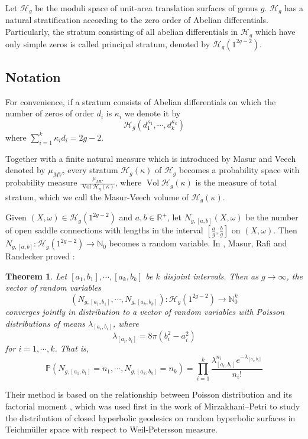 \documentclass[12pt]{amsart} %
\newtheorem{theorem}{Theorem}[section]
\theoremstyle{definition}
\theoremstyle{remark}
\numberwithin{equation}{section}
\renewcommand\H{{\mathcal H}}
\newcommand{\V}{\operatorname{Vol}}
\begin{document}
Let $\H_g$ be the moduli space of unit-area translation surfaces of genus $g$.
$\H_g$ has a natural stratification according to the zero order of Abelian differentials.
Particularly, the stratum consisting of all abelian differentials in $\H_g$ which have only simple zeros is called principal stratum, 
denoted by $\H_g(1^{2g-2})$. 

\subsection*{Notation}
For convenience, if a stratum consists of Abelian differentials on which the number of zeros of order $d_i$ is $\kappa_i$
we denote it by 
$$\H_g(d_1^{\kappa_1},\cdots,d_k^{\kappa_k})$$
where $\sum^{k}_{i=1}\kappa_id_i=2g-2$.


Together with a finite natural measure which is introduced by Masur and Veech denoted by $\mu_{MV}$, 
every stratum $\H_g(\kappa)$ of $\H_g$ becomes a probability space
with probability measure $\frac{\mu_{MV}}{\V{\H_g(\kappa)}}$, where $\V{\H_g(\kappa)}$ is the measure of total stratum, 
which we call the Masur-Veech volume of $\H_g(\kappa)$.


Given $(X,\omega)\in \H_g(1^{2g-2})$ and $a,b\in \mathbb{R}^+$,
let $N_{g,[a,b]}(X,\omega)$ be the number of open saddle connections with lengths in the interval $[\frac{a}{g},\frac{b}{g}]$ on $(X,\omega)$.
Then $N_{g,[a,b]}:\H_g(1^{2g-2})\to \mathbb{N}_0$ becomes a random variable.
In \cite{masur2024lengths}, Masur, Rafi and Randecker proved :
\begin{theorem}\label{open}
Let $[a_1,b_1],\cdots,[a_k,b_k]$ be $k$ disjoint intervals. Then as $g\to \infty$, the vector of random variables
$$(N_{g,[a_1,b_1]},\cdots,N_{g,[a_k,b_k]}):\H_g(1^{2g-2})\to \mathbb{N}_0^k$$
converges jointly in distribution to a vector of random variables with Poisson distributions of means $\lambda_{[a_i,b_i]}$, where
$$\lambda_{[a_i,b_i]}=8\pi(b_i^2-a_i^2)$$
for $i=1,\cdots,k$. That is,
$$\mathbb{P}(N_{g,[a_1,b_1]}=n_1,\cdots,N_{g,[a_k,b_k]}=n_k)=\prod_{i=1}^k\frac{\lambda_{[a_i,b_i]}^{n_i}e^{-\lambda_{[a_i,b_i]}}}{n_i!}$$
\end{theorem}


Their method is based on the relationship between Poisson distribution and its factorial moment \cite{bollobas2001random}, 
which was used first in the work of Mirzakhani–Petri \cite{mirzakhani2019lengths} to study the distribution of closed hyperbolic geodesics on random hyperbolic surfaces in Teichm\"uller space with respect to Weil-Petersson measure.
\end{document}
